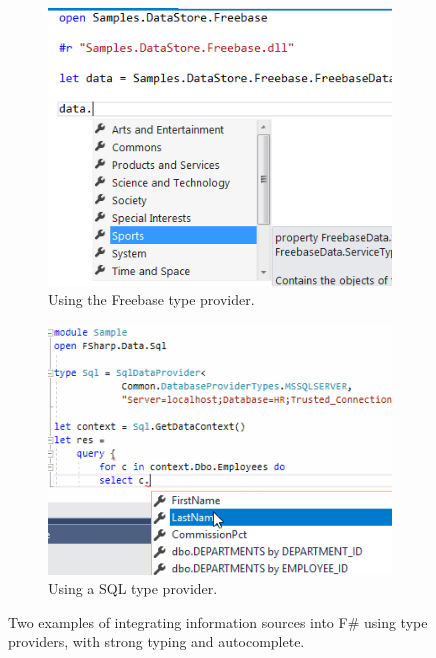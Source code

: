 \documentclass[acmsmall,screen]{acmart}
\begin{document}
\begin{figure}

  \centering
  \begin{subfigure}[b]{0.48\linewidth}
  \includegraphics[width=0.95\linewidth]{tp-freebase.png}
  \caption{Using the Freebase type provider.}
  \label{fig:freebase}
  \end{subfigure}
  \begin{subfigure}[b]{0.48\linewidth}
  \includegraphics[width=0.95\linewidth]{sql-provider.png}
  \caption{Using a SQL type provider.}
  \label{fig:sql-provider}
  \end{subfigure}
  \caption{Two examples of integrating information sources into F\# using type providers, with strong typing and autocomplete.}


\end{figure}
\end{document}

